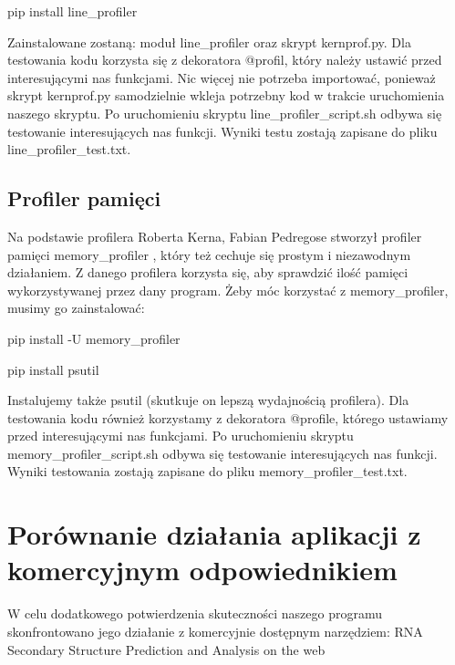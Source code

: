 \documentclass[paper=a4, fontsize=11pt]{scrartcl} %
\numberwithin{equation}{section} %
\numberwithin{figure}{section} %
\numberwithin{table}{section} %
\begin{document}
             \begin{center}
   pip install line\_profiler
\end{center}


Zainstalowane zostaną: moduł line\_profiler oraz skrypt kernprof.py. Dla testowania kodu korzysta się z dekoratora @profil, który należy ustawić przed interesującymi nas funkcjami. Nic więcej nie potrzeba importować, ponieważ skrypt kernprof.py samodzielnie wkleja potrzebny kod w trakcie uruchomienia naszego skryptu. 
Po uruchomieniu skryptu line\_profiler\_script.sh odbywa się testowanie interesujących nas funkcji. Wyniki testu zostają zapisane do pliku line\_profiler\_test.txt. 


\subsection{Profiler pamięci}
Na podstawie profilera Roberta Kerna\cite{bib:Kern}, Fabian Pedregose stworzył profiler pamięci memory\_profiler \cite{bib:mem}, który też cechuje się prostym i niezawodnym działaniem. Z danego profilera korzysta się, aby sprawdzić ilość pamięci wykorzystywanej przez  dany program. Żeby móc korzystać z memory\_profiler, musimy go zainstalować: 

          \begin{center}
          pip install -U memory\_profiler
          
                         pip install psutil
                         
\end{center}
                         
Instalujemy także psutil (skutkuje on lepszą wydajnością profilera). Dla testowania kodu również korzystamy z dekoratora @profile, którego ustawiamy przed interesującymi nas funkcjami.  Po uruchomieniu skryptu memory\_profiler\_script.sh odbywa się testowanie interesujących nas funkcji. Wyniki testowania zostają zapisane do pliku memory\_profiler\_test.txt. 





\section{Porównanie działania aplikacji z komercyjnym odpowiednikiem}


W celu dodatkowego potwierdzenia skuteczności naszego programu skonfrontowano jego działanie z komercyjnie dostępnym narzędziem: RNA Secondary Structure Prediction and Analysis on the web \cite{bib:innaApp}
\end{document}
